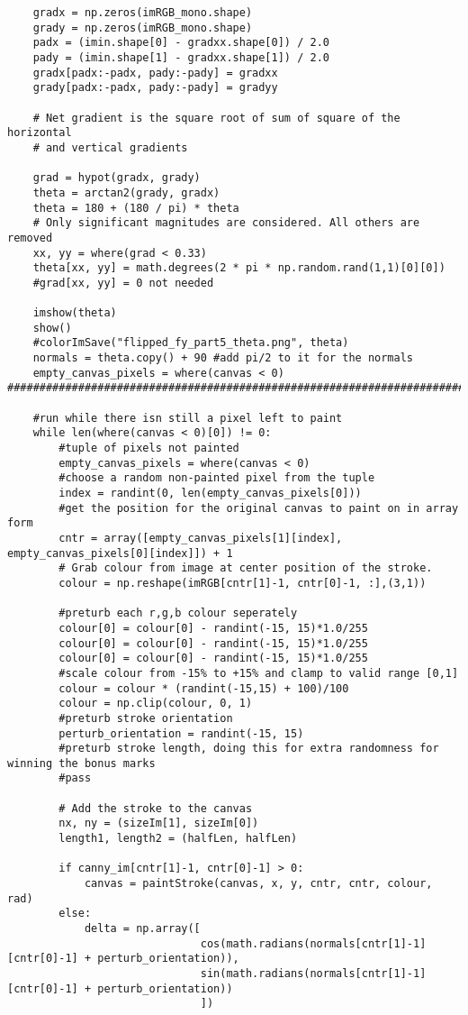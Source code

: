 \documentclass{article}
\begin{document}
\begin{lstlisting}
    gradx = np.zeros(imRGB_mono.shape)
    grady = np.zeros(imRGB_mono.shape)
    padx = (imin.shape[0] - gradxx.shape[0]) / 2.0
    pady = (imin.shape[1] - gradxx.shape[1]) / 2.0
    gradx[padx:-padx, pady:-pady] = gradxx
    grady[padx:-padx, pady:-pady] = gradyy  
    
    # Net gradient is the square root of sum of square of the horizontal
    # and vertical gradients

    grad = hypot(gradx, grady)
    theta = arctan2(grady, gradx)
    theta = 180 + (180 / pi) * theta
    # Only significant magnitudes are considered. All others are removed
    xx, yy = where(grad < 0.33)
    theta[xx, yy] = math.degrees(2 * pi * np.random.rand(1,1)[0][0])
    #grad[xx, yy] = 0 not needed
    
    imshow(theta)
    show()
    #colorImSave("flipped_fy_part5_theta.png", theta)
    normals = theta.copy() + 90 #add pi/2 to it for the normals
    empty_canvas_pixels = where(canvas < 0)
#####################################################################################
    
    #run while there isn still a pixel left to paint
    while len(where(canvas < 0)[0]) != 0:
        #tuple of pixels not painted
        empty_canvas_pixels = where(canvas < 0)
        #choose a random non-painted pixel from the tuple
        index = randint(0, len(empty_canvas_pixels[0]))
        #get the position for the original canvas to paint on in array form
        cntr = array([empty_canvas_pixels[1][index], empty_canvas_pixels[0][index]]) + 1
        # Grab colour from image at center position of the stroke.
        colour = np.reshape(imRGB[cntr[1]-1, cntr[0]-1, :],(3,1))
        
        #preturb each r,g,b colour seperately
        colour[0] = colour[0] - randint(-15, 15)*1.0/255
        colour[0] = colour[0] - randint(-15, 15)*1.0/255
        colour[0] = colour[0] - randint(-15, 15)*1.0/255
        #scale colour from -15% to +15% and clamp to valid range [0,1]
        colour = colour * (randint(-15,15) + 100)/100
        colour = np.clip(colour, 0, 1)   
        #preturb stroke orientation
        perturb_orientation = randint(-15, 15)
        #preturb stroke length, doing this for extra randomness for winning the bonus marks
        #pass
        
        # Add the stroke to the canvas
        nx, ny = (sizeIm[1], sizeIm[0])
        length1, length2 = (halfLen, halfLen)     
        
        if canny_im[cntr[1]-1, cntr[0]-1] > 0:
            canvas = paintStroke(canvas, x, y, cntr, cntr, colour, rad)
        else:            
            delta = np.array([
                              cos(math.radians(normals[cntr[1]-1][cntr[0]-1] + perturb_orientation)), 
                              sin(math.radians(normals[cntr[1]-1][cntr[0]-1] + perturb_orientation))
                              ])


\end{lstlisting}
\end{document}
